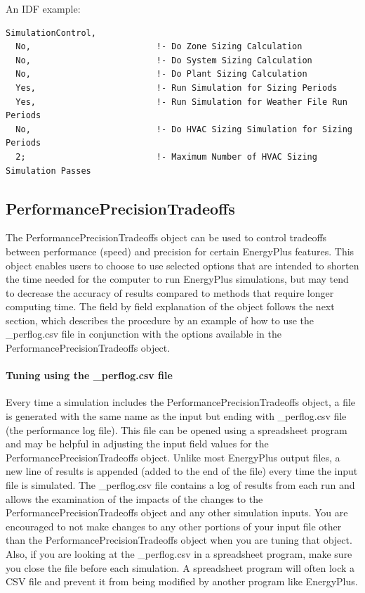 An IDF example:

\begin{lstlisting}
SimulationControl,
  No,                         !- Do Zone Sizing Calculation
  No,                         !- Do System Sizing Calculation
  No,                         !- Do Plant Sizing Calculation
  Yes,                        !- Run Simulation for Sizing Periods
  Yes,                        !- Run Simulation for Weather File Run Periods
  No,                         !- Do HVAC Sizing Simulation for Sizing Periods
  2;                          !- Maximum Number of HVAC Sizing Simulation Passes
\end{lstlisting}

\subsection{PerformancePrecisionTradeoffs}\label{performanceprecisiontradeoffs}

The PerformancePrecisionTradeoffs object can be used to control tradeoffs between performance (speed) and precision for certain EnergyPlus features. This object enables users to choose to use selected options that are intended to shorten the time needed for the computer to run EnergyPlus simulations, but may tend to decrease the accuracy of results compared to methods that require longer computing time. The field by field explanation of the object follows the next section, which describes the procedure by an example of how to use the \_perflog.csv file in conjunction with the options available in the PerformancePrecisionTradeoffs object.

\paragraph{Tuning using the \_perflog.csv file}\label{tuning-using-perlog-csv-file}

Every time a simulation includes the PerformancePrecisionTradeoffs object, a file is generated with the same name as the input but ending with \_perflog.csv file (the performance log file). This file can be opened using a spreadsheet program and may be helpful in adjusting the input field values for the PerformancePrecisionTradeoffs object. Unlike most EnergyPlus output files, a new line of results is appended (added to the end of the file) every time the input file is simulated. The \_perflog.csv file contains a log of results from each run and allows the examination of the impacts of the changes to the PerformancePrecisionTradeoffs object and any other simulation inputs. You are encouraged to not make changes to any other portions of your input file other than the PerformancePrecisionTradeoffs object when you are tuning that object. Also, if you are looking at the \_perflog.csv in a spreadsheet program, make sure you close the file before each simulation. A spreadsheet program will often lock a CSV file and prevent it from being modified by another program like EnergyPlus.

